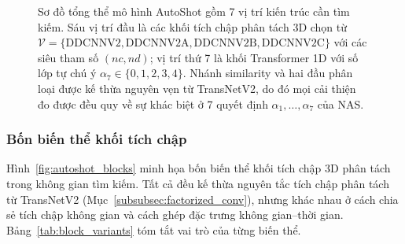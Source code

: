 \begin{figure}[H]
{
    }
    \caption[Sơ đồ tổng thể mô hình AutoShot]{Sơ đồ tổng thể mô hình AutoShot gồm 7 vị trí kiến trúc cần tìm kiếm. Sáu vị trí đầu là các khối tích chập phân tách 3D chọn từ $\mathcal{V} = \{\mathrm{DDCNNV2}, \mathrm{DDCNNV2A}, \mathrm{DDCNNV2B}, \mathrm{DDCNNV2C}\}$ với các siêu tham số $(nc, nd)$; vị trí thứ 7 là khối Transformer 1D với số lớp tự chú ý $\alpha_7 \in \{0, 1, 2, 3, 4\}$. Nhánh similarity và hai đầu phân loại được kế thừa nguyên vẹn từ TransNetV2, do đó mọi cải thiện đo được đều quy về sự khác biệt ở 7 quyết định $\alpha_1, \dots, \alpha_7$ của NAS.}
    \label{fig:autoshot_overall}
\end{figure}

\subsubsection{Bốn biến thể khối tích chập}
\label{subsubsec:four_variants}

Hình~\ref{fig:autoshot_blocks} minh họa bốn biến thể khối tích chập 3D phân tách trong không gian tìm kiếm. Tất cả đều kế thừa nguyên tắc tích chập phân tách từ TransNetV2 (Mục~\ref{subsubsec:factorized_conv}), nhưng khác nhau ở cách chia sẻ tích chập không gian và cách ghép đặc trưng không gian--thời gian. Bảng~\ref{tab:block_variants} tóm tắt vai trò của từng biến thể.

